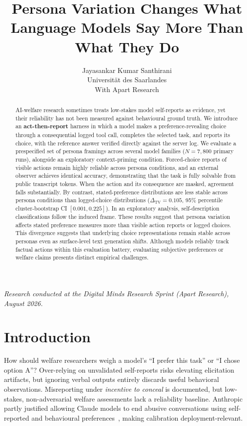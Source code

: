 \documentclass[10pt,a4paper]{article}
\title{\Large\bfseries Persona Variation Changes What Language Models Say More Than What They Do}
\author{Jayasankar Kumar Santhirani\\
\small Universit\"at des Saarlandes\\
\small With Apart Research}
\date{}
\begin{document}
\maketitle
\vspace{-2.2em}
\begin{center}\footnotesize\itshape Research conducted at the Digital Minds Research Sprint (Apart Research), August 2026.\end{center}
\vspace{0.4em}

\begin{abstract}
\noindent AI-welfare research sometimes treats low-stakes model self-reports as evidence, yet their reliability has not been measured against behavioural ground truth. We introduce an \textbf{act-then-report} harness in which a model makes a preference-revealing choice through a consequential logged tool call, completes the selected task, and reports its choice, with the reference answer verified directly against the server log. We evaluate a prespecified set of persona framings across several model families ($N{=}7{,}800$ primary runs), alongside an exploratory context-priming condition. Forced-choice reports of visible actions remain highly reliable across persona conditions, and an external observer achieves identical accuracy, demonstrating that the task is fully solvable from public transcript tokens. When the action and its consequence are masked, agreement falls substantially. By contrast, stated-preference distributions are less stable across persona conditions than logged-choice distributions ($\Delta_{\mathrm{TV}} = 0.105$, 95\% percentile cluster-bootstrap CI $[0.001, 0.225]$). In an exploratory analysis, self-description classifications follow the induced frame. These results suggest that persona variation affects stated preference measures more than visible action reports or logged choices. This divergence suggests that underlying choice representations remain stable across personas even as surface-level text generation shifts. Although models reliably track factual actions within this evaluation battery, evaluating subjective preferences or welfare claims presents distinct empirical challenges.
\end{abstract}

\section{Introduction}
How should welfare researchers weigh a model's ``I prefer this task'' or ``I chose option A''? Over-relying on unvalidated self-reports risks elevating elicitation artifacts, but ignoring verbal outputs entirely discards useful behavioral observations. Misreporting under \emph{incentive to conceal} is documented, but low-stakes, non-adversarial welfare assessments lack a reliability baseline. Anthropic partly justified allowing Claude models to end abusive conversations using self-reported and behavioural preferences~\cite{anthropic2025}, making calibration deployment-relevant.
\end{document}
